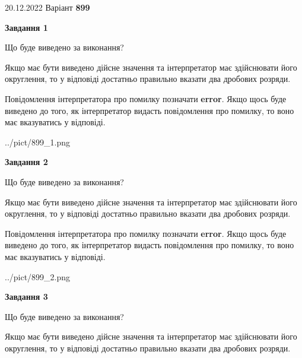 \documentclass[12pt, ukrainian]{article}
\begin{document}
{20.12.2022 Варіант \No \textbf { 899 }\par}
{
\begin {Large}

{\begin {center}\textbf{Завдання 1}\end {center}}\par
Що буде виведено за виконання? \par

Якщо має бути виведено дійсне значення та інтерпретатор має здійснювати його округлення, 
то у відповіді достатньо правильно вказати два дробових розряди.

Повідомлення інтерпретатора про помилку позначати \textbf{error}.
Якщо щось буде виведено до того, як інтерпретатор видасть повідомлення про помилку, 
то воно має вказуватись у відповіді. \par

\begin{center}
	{../pict/899_1.png}
\end{center}
\newpage

{\begin {center}\textbf{Завдання 2}\end {center}}\par
Що буде виведено за виконання? \par

Якщо має бути виведено дійсне значення та інтерпретатор має здійснювати його округлення, 
то у відповіді достатньо правильно вказати два дробових розряди.

Повідомлення інтерпретатора про помилку позначати \textbf{error}.
Якщо щось буде виведено до того, як інтерпретатор видасть повідомлення про помилку, 
то воно має вказуватись у відповіді. \par

\begin{center}
	{../pict/899_2.png}
\end{center}
\newpage

{\begin {center}\textbf{Завдання 3}\end {center}}\par
Що буде виведено за виконання? \par

Якщо має бути виведено дійсне значення та інтерпретатор має здійснювати його округлення, 
то у відповіді достатньо правильно вказати два дробових розряди.


\end{Large}}
\end{document}
